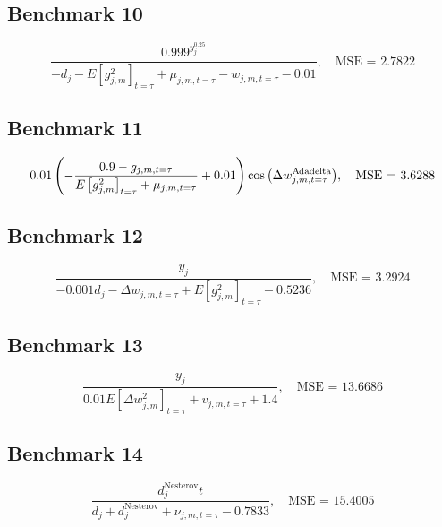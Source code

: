 \subsection*{Benchmark 10}
\begin{equation}
\label{eq:benchmark-10}
\frac{{0.999}^{y_{j}^{0.25}}}{- d_{j} - E\left[g_{j, m}^2\right]_{t=\tau} + \mu_{j,m,t=\tau} - w_{j,m,t=\tau} - 0.01}, \quad \text{MSE = } 2.7822
\end{equation}


\subsection*{Benchmark 11}
\begin{equation}
\label{eq:benchmark-11}
0.01 \left(- \frac{0.9 - g_{j, m, t=\tau}}{E\left[g_{j, m}^2\right]_{t=\tau} + \mu_{j,m,t=\tau}} + 0.01\right) \cos{\left(\Delta w^{\text{A}\hspace{-.018cm}\text{dadelta}}_{j, m, t=\tau} \right)}, \quad \text{MSE = } 3.6288
\end{equation}


\subsection*{Benchmark 12}
\begin{equation}
\label{eq:benchmark-12}
\frac{y_{j}}{- 0.001 d_{j} - \Delta w_{j, m, t=\tau} + E\left[g_{j, m}^2\right]_{t=\tau} - 0.5236}, \quad \text{MSE = } 3.2924
\end{equation}


\subsection*{Benchmark 13}
\begin{equation}
\label{eq:benchmark-13}
\frac{y_{j}}{0.01 E\left[\Delta w_{j, m}^2\right]_{t=\tau} + v_{j, m, t=\tau} + 1.4}, \quad \text{MSE = } 13.6686
\end{equation}


\subsection*{Benchmark 14}
\begin{equation}
\label{eq:benchmark-14}
\frac{d_{j}^{\mathrm{Nesterov}} t}{d_{j} + d_{j}^{\mathrm{Nesterov}} + \nu_{j,m,t=\tau} - 0.7833}, \quad \text{MSE = } 15.4005
\end{equation}



